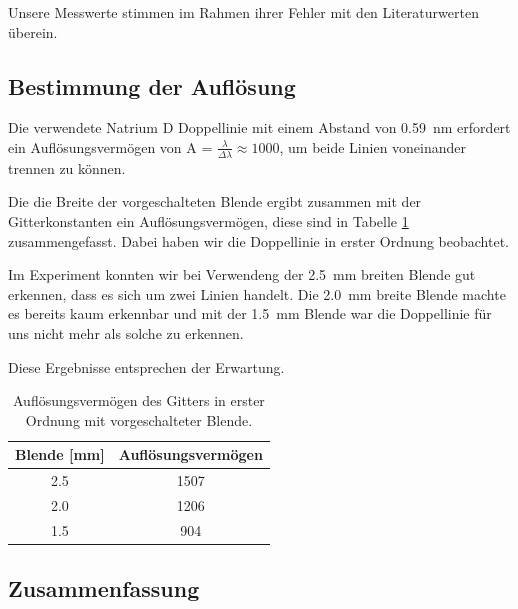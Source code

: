 \documentclass[12pt,a4paper]{article}
\begin{document}
	Unsere Messwerte stimmen im Rahmen ihrer Fehler mit den Literaturwerten überein.
	
	\subsection{Bestimmung der Auflösung}
	
	Die verwendete Natrium D Doppellinie mit einem Abstand von \SI{0.59}{nm} erfordert ein Auflösungsvermögen von A = $\frac{\lambda}{\Delta\lambda} \approx 1000 $, um beide Linien voneinander trennen zu können.
	
	Die die Breite der vorgeschalteten Blende ergibt zusammen mit der Gitterkonstanten ein Auflösungsvermögen, diese sind in Tabelle \ref{tab:gitter_auflösung} zusammengefasst. Dabei haben wir die Doppellinie in erster Ordnung beobachtet.
	
	Im Experiment konnten wir bei Verwendeng der \SI{2.5}{mm} breiten Blende gut erkennen, dass es sich um zwei Linien handelt. Die \SI{2.0}{mm} breite Blende machte es bereits kaum erkennbar und mit der \SI{1.5}{mm} Blende war die Doppellinie für uns nicht mehr als solche zu erkennen.
	
	Diese Ergebnisse entsprechen der Erwartung.
	
	\begin{table}
		\centering
		\begin{tabular}{|c|c|}
			\hline
			Blende [mm] & Auflösungsvermögen \\
			\hline \hline
			2.5 & 1507 \\
			\hline
			2.0 & 1206 \\
			\hline
			1.5 & 904 \\
			\hline
		\end{tabular}
		\caption{Auflösungsvermögen des Gitters in erster Ordnung mit vorgeschalteter Blende.}
		\label{tab:gitter_auflösung}
	\end{table}
	
	\subsection{Zusammenfassung}
	
	
\end{document}
